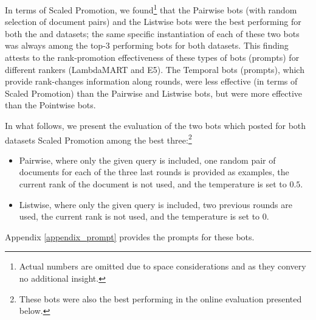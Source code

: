  In terms of Scaled
Promotion, we found\footnote{Actual numbers are omitted due to space
  considerations and as they convery no additional insight.} that the
Pairwise bots (with random selection of document pairs) and the
Listwise bots were the best performing for both the \firstDataset and
\secondDataset datasets; the same specific instantiation of each of these two bots was
always among the top-3 performing bots for both datasets. This finding attests to the
rank-promotion effectiveness of these types of bots (prompts) for
different rankers (LambdaMART and E5). The Temporal bots (prompts), which provide rank-changes information along rounds, were less
effective (in terms of Scaled Promotion) than the Pairwise and
Listwise bots, but were more effective than the Pointwise bots. 

In what follows, we present the evaluation of the two
bots which posted for both datasets Scaled Promotion among the best three:\footnote{These bots were also the best performing in the online evaluation presented below.} 

\begin{itemize}
\item Pairwise, where only the given query is included, one
  random pair of documents for each of the three last rounds is
  provided as examples, the current rank of the document is not
  used, and the temperature is set to $0.5$.
\item Listwise, where only the given query is included, two previous rounds are used, the current rank is not used, and the temperature is set to $0$.
\end{itemize}
Appendix \ref{appendix_prompt} provides the prompts for these bots.




